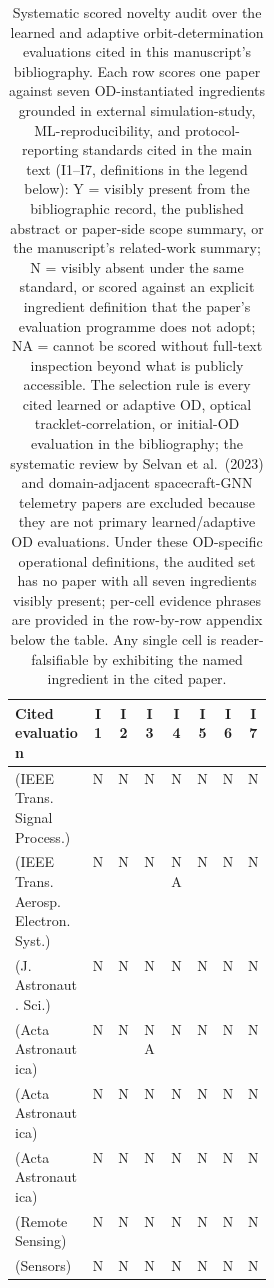 \begin{table}[t]
  \centering\scriptsize
  \caption{Systematic scored novelty audit over the learned and adaptive orbit-determination evaluations cited in this manuscript's bibliography. Each row scores one paper against seven OD-instantiated ingredients grounded in external simulation-study, ML-reproducibility, and protocol-reporting standards cited in the main text (I1--I7, definitions in the legend below): Y = visibly present from the bibliographic record, the published abstract or paper-side scope summary, or the manuscript's related-work summary; N = visibly absent under the same standard, or scored against an explicit ingredient definition that the paper's evaluation programme does not adopt; NA = cannot be scored without full-text inspection beyond what is publicly accessible. The selection rule is every cited learned or adaptive OD, optical tracklet-correlation, or initial-OD evaluation in the bibliography; the systematic review by Selvan et al.\ (2023) and domain-adjacent spacecraft-GNN telemetry papers are excluded because they are not primary learned/adaptive OD evaluations. Under these OD-specific operational definitions, the audited set has no paper with all seven ingredients visibly present; per-cell evidence phrases are provided in the row-by-row appendix below the table. Any single cell is reader-falsifiable by exhibiting the named ingredient in the cited paper.}
  \label{tab:novelty_audit_systematic}
  \begin{tabular}{p{0.30\linewidth}ccccccc}
    \toprule
    Cited evaluation & I1 & I2 & I3 & I4 & I5 & I6 & I7 \\
    \midrule
    \cite{revach2022kalmannet} (IEEE Trans. Signal Process.) & N & N & N & N & N & N & N \\
    \cite{stacey2021adaptive} (IEEE Trans. Aerosp. Electron. Syst.) & N & N & N & NA & N & N & N \\
    \cite{scorsoglio2023pinn} (J. Astronaut. Sci.) & N & N & N & N & N & N & N \\
    \cite{scorsoglio2026xgeo} (Acta Astronautica) & N & N & NA & N & N & N & N \\
    \cite{ramponi2026pontryagin} (Acta Astronautica) & N & N & N & N & N & N & N \\
    \cite{zhou2023lstm} (Acta Astronautica) & N & N & N & N & N & N & N \\
    \cite{zhang2024libration} (Remote Sensing) & N & N & N & N & N & N & N \\
    \cite{chen2024robust} (Sensors) & N & N & N & N & N & N & N \\

\end{tabular}
\end{table}
